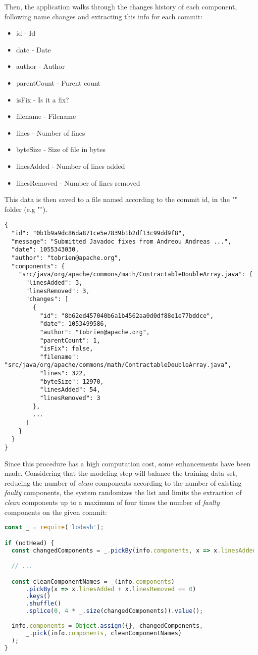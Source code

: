 Then, the application walks through the changes history of each component, following name changes and extracting this info for each commit:
%
\begin{itemize}
\item id - Id
\item date - Date
\item author - Author
\item parentCount - Parent count
\item isFix - Is it a fix?
\item filename - Filename
\item lines - Number of lines
\item byteSize - Size of file in bytes
\item linesAdded - Number of lines added
\item linesRemoved - Number of lines removed
\end{itemize}

This data is then saved to a file named according to the commit id, in the "" folder (e.g "").

\begin{lstlisting}
{
  "id": "0b1b9a9dc86da871ce5e7839b1b2df13c99dd9f8",
  "message": "Submitted Javadoc fixes from Andreou Andreas ...",
  "date": 1055343030,
  "author": "tobrien@apache.org",
  "components": {
    "src/java/org/apache/commons/math/ContractableDoubleArray.java": {
      "linesAdded": 3,
      "linesRemoved": 3,
      "changes": [
        {
          "id": "8b62ed457040b6a1b4562aa0d0df88e1e77bddce",
          "date": 1053499586,
          "author": "tobrien@apache.org",
          "parentCount": 1,
          "isFix": false,
          "filename": "src/java/org/apache/commons/math/ContractableDoubleArray.java",
          "lines": 322,
          "byteSize": 12970,
          "linesAdded": 54,
          "linesRemoved": 3
        },
        ...
      ]
    }
  }
}
\end{lstlisting}

Since this procedure has a high computation cost, some enhancements have been made. Considering that the modeling step will balance the training data set, 
reducing the number of \emph{clean} components according to the number of existing \emph{faulty} components, the system randomizes the list and
limits the extraction of \emph{clean} components up to a maximum of four times the number of \emph{faulty} components on the given commit: 
%
\begin{lstlisting}[language=Javascript]
const _ = require('lodash');

if (notHead) {
  const changedComponents = _.pickBy(info.components, x => x.linesAdded + x.linesRemoved > 0);

  // ...

  const cleanComponentNames = _(info.components)
      .pickBy(x => x.linesAdded + x.linesRemoved == 0)
      .keys()
      .shuffle()
      .splice(0, 4 * _.size(changedComponents)).value();
  
  info.components = Object.assign({}, changedComponents,
      _.pick(info.components, cleanComponentNames)
  );
}
\end{lstlisting}

